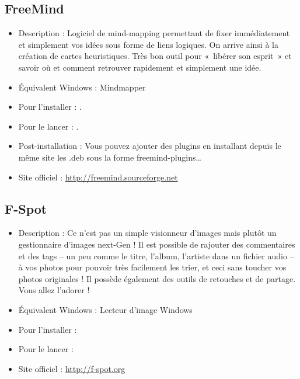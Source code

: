 \subsection{FreeMind}
\begin{itemize}
\begingroup
{}
\item Description : Logiciel de mind-mapping permettant de fixer immédiatement et simplement vos idées sous forme de liens logiques. On arrive ainsi à la création de cartes heuristiques. Très bon outil pour «~libérer son esprit~» et savoir où et comment retrouver rapidement et simplement une idée.{\par}
\endgroup
\item Équivalent Windows : Mindmapper{\par}
\item Pour l'installer : .{\par}
\item Pour le lancer : .{\par}
\item Post-installation : Vous pouvez ajouter des plugins en installant depuis le même site les .deb sous la forme freemind-plugins\ldots{}{\par}
\item Site officiel : \url{http://freemind.sourceforge.net}{\par}
\end{itemize}
\subsection{F-Spot}
\label{RefF-Spot}
\begin{itemize}
\begingroup
{}
\item Description : Ce n'est pas un simple visionneur d'images mais plutôt un gestionnaire d'images next-Gen ! Il est possible de rajouter des commentaires et des tags -- un peu comme le titre, l'album, l'artiste dans un fichier audio -- à vos photos pour pouvoir très facilement les trier, et ceci sans toucher vos photos originales ! Il possède également des outils de retouches et de partage. Vous allez l'adorer !{\par}
\item Équivalent Windows : Lecteur d'image Windows{\par}
\item Pour l'installer : 
\item Pour le lancer : 
\item Site officiel : \url{http://f-spot.org}{\par}
\endgroup
\end{itemize}

